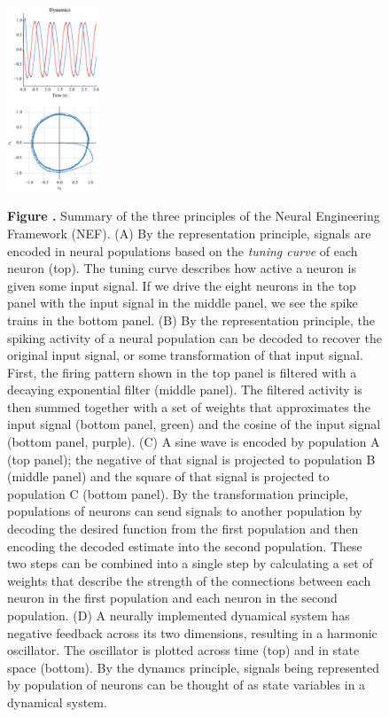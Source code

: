 \documentclass{frontiersSCNS}
\begin{document}
\begin{figure}
\begin{center}
  \includegraphics[width=0.245\textwidth]{nef_summary_dyn}
\end{center}
 \textbf{\label{fig:nef} Figure .}{
   Summary of the three principles of the Neural Engineering Framework
   (NEF). (A) By the representation principle, signals are encoded
   in neural populations based on the \textit{tuning curve}
   of each neuron (top). The tuning curve describes
   how active a neuron is given some input signal.
   If we drive the eight neurons in the top panel
   with the input signal in the middle panel,
   we see the spike trains in the bottom panel.
   (B) By the representation principle,
   the spiking activity of a neural population
   can be decoded to recover the original input signal,
   or some transformation of that input signal.
   First, the firing pattern shown in the top panel
   is filtered with a decaying exponential filter (middle panel).
   The filtered activity is then summed together
   with a set of weights that approximates
   the input signal (bottom panel, green)
   and the cosine of the input signal (bottom panel, purple).
   (C) A sine wave is encoded by population A (top panel);
   the negative of that signal is projected
   to population B (middle panel)
   and the square of that signal is projected
   to population C (bottom panel).
   By the transformation principle,
   populations of neurons can send signals
   to another population by decoding
   the desired function from the first population
   and then encoding the decoded estimate
   into the second population.
   These two steps can be combined into a single step
   by calculating a set of weights
   that describe the strength of the connections
   between each neuron in the first population
   and each neuron in the second population.
   (D) A neurally implemented dynamical system
   has negative feedback across its two dimensions,
   resulting in a harmonic oscillator.
   The oscillator is plotted across time (top)
   and in state space (bottom).
   By the dynamcs principle,
   signals being represented by population of neurons
   can be thought of as state variables in a dynamical system.
   }
\end{figure}
\end{document}
